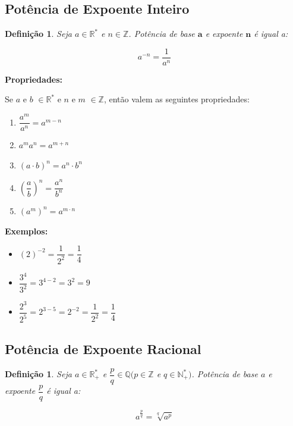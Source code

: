\subsection{Potência de Expoente Inteiro}

\newtheorem{definicao}{Definição}
\begin{definicao}
	Seja $a \in \mathbb{R}^* $ e $ n \in \mathbb{Z}$. Potência de base $\textbf{a}$ e expoente $\textbf{n}$ é igual a:	
\end{definicao}

$$ a^{-n} = \dfrac{1}{a^n}$$

\textbf{Propriedades:}

Se $a$ e $b$ $ \in \mathbb{R}^*$ e  $n$ e $ m$ $ \in \mathbb{Z}$, então valem as seguintes propriedades:

\begin{enumerate}

\item $\dfrac{a^m}{a^n} = a^{m-n}$
\item $a^{m}a^{n} = a^{m+n}$
\item $(a\cdot b)^n = a^n \cdot b^n$
\item $\left(\dfrac{a}{b}\right)^n = \dfrac{a^n}{b^n} $
\item $(a^m)^n = a^{m\cdot n}$

\end{enumerate}
\textbf{Exemplos:}

\begin{itemize}

	\item $(2)^{-2} = \dfrac{1}{2^2} = \dfrac{1}{4}$
	\item $ \dfrac{3^4}{3^2} = 3^{ 4-2} = 3^{2} = 9 $ 
	\item $ \dfrac{2^3}{2^5} = 2^{ 3-5} = 2^{-2} = \dfrac{1}{2^2} = \dfrac{1}{4}$
\end{itemize}

\subsection{Potência de Expoente Racional}

\newtheorem{definicao}{Definição}
\begin{definicao}
	Seja $a \in \mathbb{R}^*_+ $ e $ \dfrac{p}{q} \in \mathbb{Q} (p \in \mathbb{Z}$ e $ q \in \mathbb{N}^*_+)$. Potência de base $a$ e expoente $\dfrac{p}{q}$ é igual a:	
\end{definicao}

$$ a^{\frac{p}{q}} = \sqrt[q]{a^p} $$

